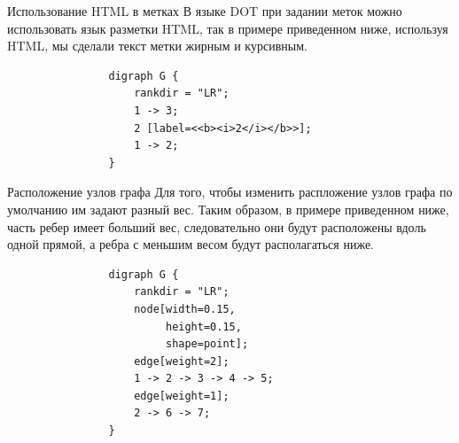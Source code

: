 \documentclass{beamer}
\begin{document}
\begin{frame}[fragile]{Использование HTML в метках}
	В языке DOT при задании меток можно использовать язык разметки HTML, так в примере приведенном ниже, используя HTML, мы сделали текст метки жирным и курсивным.
	\newline
	\newline
	\begin{minipage}{0.5\textwidth}
		\begin{verbatim}
				digraph G {
					rankdir = "LR";
					1 -> 3;
					2 [label=<<b><i>2</i></b>>];
					1 -> 2;
				}
		\end{verbatim}
	\end{minipage}
	\hfill
	\begin{minipage}{0.45\textwidth}
	\end{minipage}
\end{frame}

\begin{frame}[fragile]{Расположение узлов графа}
	Для того, чтобы изменить распложение узлов графа по умолчанию им задают разный вес. Таким образом, в примере приведенном ниже, часть ребер имеет больший вес, следовательно они будут расположены вдоль одной прямой, а ребра с меньшим весом будут располагаться ниже.
	\newline
	\newline
	\begin{minipage}{0.4\textwidth}
		\begin{verbatim}
				digraph G {
					rankdir = "LR";
					node[width=0.15,
					     height=0.15,
					     shape=point];
					edge[weight=2];
					1 -> 2 -> 3 -> 4 -> 5;
					edge[weight=1];
					2 -> 6 -> 7;
				}
		\end{verbatim}
	\end{minipage}
	\hfill
	\begin{minipage}{0.55\textwidth}
	\end{minipage}
\end{frame}
\end{document}
